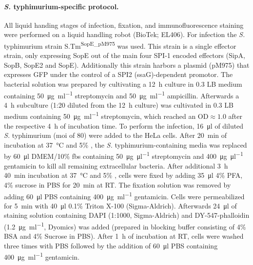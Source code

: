 \paragraph{\textit{S.} typhimurium-specific protocol.}
All liquid handing stages of infection, fixation, and immunofluorescence staining were performed on a liquid handling robot (BioTek; EL406). For infection the \textit{S.} typhimurium strain S.Tm\textsuperscript{SopE\_pM975} was used. This strain is a single effector strain, only expressing SopE out of the main four SPI-1 encoded effectors (SipA, SopB, SopE2 and SopE). Additionally this strain harbors a plasmid (pM975) that expresses GFP under the control of a SPI2 (ssaG)-dependent promotor. The bacterial solution was prepared by cultivating a \SI{12}{\hour} culture in \SI{0.3}{\Molar} LB medium containing \SI{50}{\micro\gram\per\milli\litre} streptomycin and \SI{50}{\micro\gram\per\milli\litre} ampicillin. Afterwards a \SI{4}{\hour} subculture (1:20 diluted from the \SI{12}{\hour} culture) was cultivated in \SI{0.3}{\Molar} LB medium containing \SI{50}{\micro\gram\per\milli\litre} streptomycin, which reached an OD$\approx1.0$ after the respective \SI{4}{\hour} of incubation time. To perform the infection, \SI{16}{\micro\litre} of diluted \textit{S.} typhimurium (\gls{moi} of 80) were added to the HeLa cells. After \SI{20}{\minute} of incubation at \SI{37}{\celsius} and 5\% , the \textit{S.} typhimurium-containing media was replaced by \SI{60}{\micro\litre} DMEM\slash 10\% \gls{fbs} containing \SI{50}{\micro\gram\per\micro\litre} streptomycin and \SI{400}{\micro\gram\per\micro\litre} gentamicin to kill all remaining extracellular bacteria. After additional \SI{3}{\hour} \SI{40}{\minute} incubation at \SI{37}{\celsius} and 5\% , cells were fixed by adding \SI{35}{\micro\litre} 4\% PFA, 4\% sucrose in PBS for \SI{20}{\minute} at RT. The fixation solution was removed by adding \SI{60}{\micro\litre} PBS containing \SI{400}{\micro\gram\per\milli\litre} gentamicin. Cells were permeabilized for \SI{5}{\minute} with \SI{40}{\micro\litre} 0.1\% Triton X-100 (Sigma-Aldrich). Afterwards \SI{24}{\micro\litre} of staining solution containing DAPI (1:1000, Sigma-Aldrich) and DY-547-phalloidin (\SI{1.2}{\micro\gram\per\milli\litre}, Dyomics) was added (prepared in blocking buffer consisting of 4\% BSA and 4\% Sucrose in PBS). After \SI{1}{\hour} of incubation at RT, cells were washed three times with PBS followed by the addition of \SI{60}{\micro\litre} PBS containing \SI{400}{\micro\gram\per\milli\litre} gentamicin.

